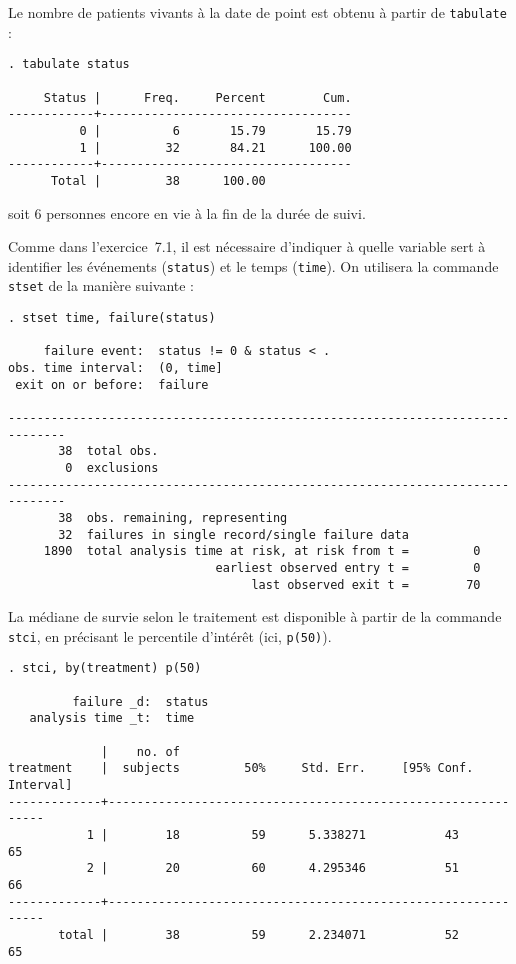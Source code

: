 Le nombre de patients vivants à la date de point est obtenu à partir de
\texttt{tabulate} :
\begin{verbatim}
. tabulate status

     Status |      Freq.     Percent        Cum.
------------+-----------------------------------
          0 |          6       15.79       15.79
          1 |         32       84.21      100.00
------------+-----------------------------------
      Total |         38      100.00
\end{verbatim}
soit 6 personnes encore en vie à la fin de la durée de suivi.

Comme dans l'exercice~7.1, il est nécessaire d'indiquer à \Stata quelle
variable sert à identifier les événements (\texttt{status}) et le temps
(\texttt{time}). On utilisera la commande \texttt{stset} de la manière
suivante :
\begin{verbatim}
. stset time, failure(status)

     failure event:  status != 0 & status < .
obs. time interval:  (0, time]
 exit on or before:  failure

------------------------------------------------------------------------------
       38  total obs.
        0  exclusions
------------------------------------------------------------------------------
       38  obs. remaining, representing
       32  failures in single record/single failure data
     1890  total analysis time at risk, at risk from t =         0
                             earliest observed entry t =         0
                                  last observed exit t =        70
\end{verbatim}

La médiane de survie selon le traitement est disponible à partir de la
commande \texttt{stci}, en précisant le percentile d'intérêt (ici,
\texttt{p(50)}). 
\begin{verbatim}
. stci, by(treatment) p(50)

         failure _d:  status
   analysis time _t:  time

             |    no. of 
treatment    |  subjects         50%     Std. Err.     [95% Conf. Interval]
-------------+-------------------------------------------------------------
           1 |        18          59      5.338271           43         65
           2 |        20          60      4.295346           51         66
-------------+-------------------------------------------------------------
       total |        38          59      2.234071           52         65
\end{verbatim}

